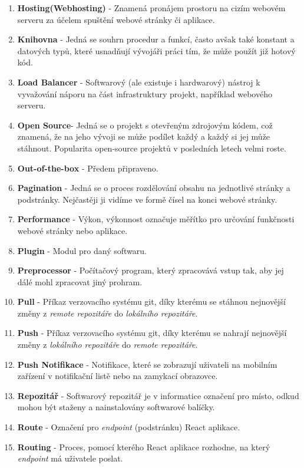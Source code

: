 \documentclass[12pt,a4paper]{report}
\begin{document}
\begin{enumerate}
    \item \textbf{Hosting(Webhosting)} - Znamená pronájem prostoru na cizím webovém serveru za účelem spuštění webové stránky či aplikace. 
    \item \textbf{Knihovna} - Jedná se souhrn procedur a funkcí, často avšak také konstant a datových typů, které usnadňují vývojáři práci tím, že může použít již hotový kód.
    \item \textbf{Load Balancer} - Softwarový (ale existuje i hardwarový) nástroj k vyvažování náporu na část infrastruktury projekt, například webového serveru.
    \item \textbf{Open Source}- Jedná se o projekt s otevřeným zdrojovým kódem, což znamená, že na jeho vývoji se může podílet každý a každý si jej může stáhnout. Popularita open-source projektů v posledních letech velmi roste.
    \item \textbf{Out-of-the-box} - Předem připraveno. 
    \item \textbf{Pagination} - Jedná se o proces rozdělování obsahu na jednotlivé stránky a podstránky. Nejčastěji ji vidíme ve formě čísel na konci webové stránky.
    \item \textbf{Performance} - Výkon, výkonnost označuje měřítko pro určování funkčnosti webové stránky nebo aplikace.
    \item \textbf{Plugin} - Modul pro daný softwaru.
    \item \textbf{Preprocessor} - Počítačový program, který zpracovává vstup tak, aby jej dálé mohl zpracovat jiný prohram.
    \item \textbf{Pull} - Příkaz verzovacího systému git, díky kterému se stáhnou nejnovější změny z \emph{remote repozitáře} do \emph{lokálního repozitáře}.
    \item \textbf{Push} - Příkaz verzovacího systému git, díky kterému se nahrají nejnovější změny z \emph{lokálního repozitáře} do \emph{remote repozitáře}.
    \item \textbf{Push Notifikace}  - Notifikace, které se zobrazují uživateli na mobilním zařízení v notifikační listě nebo na zamykací obrazovce.
    \item \textbf{Repozitář} - Softwarový repozitář je v informatice označení pro místo, odkud mohou být staženy a nainstalovány softwarové balíčky.
    \item \textbf{Route} - Označení pro \emph{endpoint} (podstránku) React aplikace.
    \item \textbf{Routing} - Proces, pomocí kterého React aplikace rozhodne, na který \emph{endpoint} má uživatele poslat.

\end{enumerate}
\end{document}
